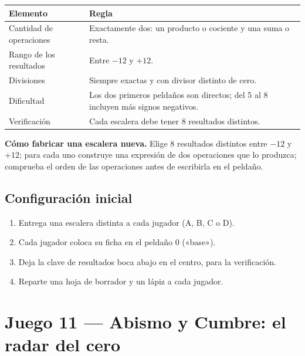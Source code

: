 \documentclass[12pt, letterpaper]{article}
\begin{document}
\begin{center}
\small
\begin{tabular}{@{}p{4.6cm} p{9.4cm}@{}}
\toprule
\textbf{Elemento} & \textbf{Regla}\\
\midrule
Cantidad de operaciones & Exactamente dos: un producto o cociente y una suma o resta.\\
Rango de los resultados & Entre $-12$ y $+12$.\\
Divisiones & Siempre exactas y con divisor distinto de cero.\\
Dificultad & Los dos primeros peldaños son directos; del 5 al 8 incluyen más signos negativos.\\
Verificación & Cada escalera debe tener 8 resultados distintos.\\
\bottomrule
\end{tabular}
\end{center}

\begin{cuadroadvertencia}
\textbf{Cómo fabricar una escalera nueva.} Elige 8 resultados distintos entre $-12$ y $+12$; para cada uno construye una expresión de dos operaciones que lo produzca; comprueba el orden de las operaciones antes de escribirla en el peldaño.
\end{cuadroadvertencia}

\subsection{Configuración inicial}

\begin{enumerate}[leftmargin=*]
  \item Entrega una escalera distinta a cada jugador (A, B, C o D).
  \item Cada jugador coloca su ficha en el peldaño 0 («base»).
  \item Deja la clave de resultados boca abajo en el centro, para la verificación.
  \item Reparte una hoja de borrador y un lápiz a cada jugador.
\end{enumerate}

\clearpage
\section{Juego 11 — Abismo y Cumbre: el radar del cero}
\end{document}

